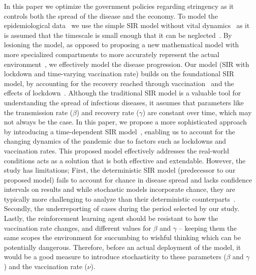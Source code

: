\documentclass[tikz,fleqn,12pt]{wlscirep}
\begin{document}
In this paper we optimize the government policies regarding stringency as it controls both the spread of the disease and the economy. To model the epidemiological data~\cite{WorldometerCorona} we use the simple SIR model without vital dynamics~\cite{Hethcote1989, Hethcote2008, ALLEN2017128} as it is assumed that the timescale is small enough that it can be neglected~\cite{Cooper2020}. By lesioning the model, as opposed to proposing a new mathematical model with more specialized compartments to more accurately represent the actual environment~\cite{Bjrnstad2020, Mwalili2020}, we effectively model the disease progression. Our model (SIR with lockdown and time-varying vaccination rate) builds on the foundational SIR model, by accounting for the recovery reached through vaccination~\cite{Marinov2022,MaurciodeCarvalho2023,Thater,Turkyilmazoglu2022,YALADANDA2022101052} and the effects of lockdown~\cite{Hale2021,SIRLockdown,NBERw26981,NBERw26867}. Although the traditional SIR model is a valuable tool for understanding the spread of infectious diseases, it assumes that parameters like the transmission rate ($\beta$) and recovery rate ($\gamma$) are constant over time, which may not always be the case. In this paper, we propose a more sophisticated approach by introducing a time-dependent SIR model~\cite{TimeDependentSIR}, enabling us to account for the changing dynamics of the pandemic due to factors such as lockdowns and vaccination rates. This proposed model effectively addresses the real-world conditions acts as a solution that is both effective and extendable. However, the study has limitations; First, the deterministic SIR model (predecessor to our proposed model) fails to account for chance in disease spread and lacks confidence intervals on results and while stochastic models incorporate chance, they are typically more challenging to analyze than their deterministic counterparts~\cite{Hethcote2008}. Secondly, the underreporting of cases during the period selected by our study. Lastly, the reinforcement learning agent should be resistant to how the vaccination rate changes, and different values for $\beta$ and $\gamma$ -- keeping them the same scopes the environment for succumbing to wishful thinking which can be potentially dangerous. Therefore, before an actual deployment of the model, it would be a good measure to introduce stochasticity to these parameters ($\beta$ and $\gamma$) and the vaccination rate ($\nu$). 
\end{document}
